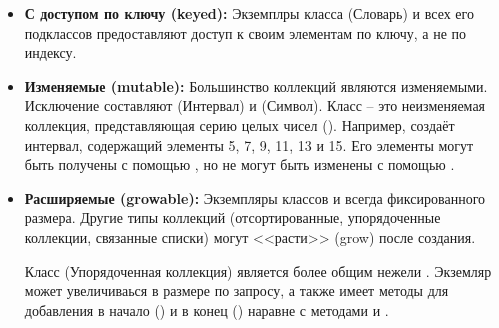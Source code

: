 \documentclass[a4paper,10pt,twoside]{book}
\begin{document}
\begin{itemize}
  \item {\bf С доступом по ключу (keyed):}
	Экземплры класса  (Словарь) и всех его подклассов предоставляют доступ к своим элементам по ключу, а не по индексу.

  \item {\bf Изменяемые (mutable):}
	Большинство коллекций являются изменяемыми. Исключение составляют  (Интервал) и  (Символ).
	Класс  -- это неизменяемая коллекция, представляющая серию целых чисел (). Например,  создаёт интервал, содержащий элементы 5, 7, 9, 11, 13 и 15. Его элементы могут быть получены с помощью , но не могут быть изменены с помощью .

  \item {\bf Расширяемые (growable):}
	Экземпляры классов  и  всегда фиксированного размера. Другие типы коллекций (отсортированные, упорядоченные коллекции, связанные списки) могут <<расти>> (grow) после создания.
	
	Класс  (Упорядоченная коллекция) является более общим нежели  . Экземляр  может увеличиваься в размере по запросу, а также имеет методы для добавления в начало () и в конец () наравне с методами  и .
  

\end{itemize}
\end{document}
